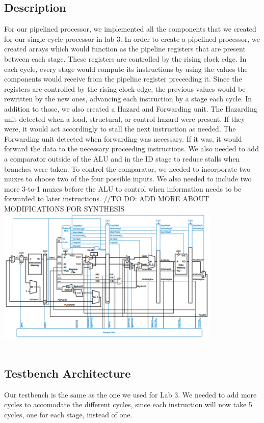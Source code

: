 \documentclass{article}
\begin{document}
\subsection{Description}
For our pipelined processor, we implemented all the components that we created for our single-cycle processor in lab 3. In order to create a pipelined processor, we created arrays which would function as the pipeline registers that are present between each stage. These registers are controlled by the rising clock edge. In each cycle, every stage would compute its instructions by using the values the components would receive from the pipeline register preceeding it. Since the registers are controlled by the rising clock edge, the previous values would be rewritten by the new ones, advancing each instruction by a stage each cycle.  In addition to those, we also created a Hazard and Forwarding unit. The Hazarding unit detected when a load, structural, or control hazard were present. If they were, it would act accordingly to stall the next instruction as needed. The Forwarding unit detected when forwarding was necessary. If it was, it would forward the data to the necessary proceeding instructions. We also needed to add a comparator outside of the ALU and in the ID stage to reduce stalls when branches were taken. To control the comparator, we needed to incorporate two muxes to choose two of the four possible inputs. We also needed to include two more 3-to-1 muxes before the ALU to control when information needs to be forwarded to later instructions. //TO DO: ADD MORE ABOUT MODIFICATIONS FOR SYNTHESIS \\

\includegraphics[width=0.8\textwidth]{PipelinedDatapath.png} \\ \\


\subsection{Testbench Architecture}
Our testbench is the same as the one we used for Lab 3. We needed to add more cycles to accomodate the different cycles, since each instruction will now take 5 cycles, one for each stage, instead of one.
\end{document}
